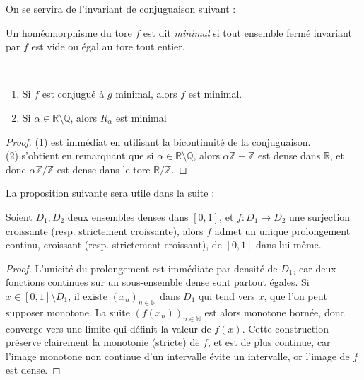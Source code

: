 \documentclass[11pt,a4paper]{article}
\begin{document}
On se servira de l'invariant de conjuguaison suivant : 

\begin{defin} 
Un homéomorphisme du tore $f$ est dit \textit{minimal} si tout ensemble fermé invariant par  $f$ est vide ou égal au tore tout entier. 
\end{defin}


\begin{prop}\label{minimal} ~
\begin{enumerate}
\item Si $f$ est conjugué à $g$ minimal, alors $f$ est minimal.
\item Si $\alpha \in \mathbb{R} \setminus \mathbb{Q}$, alors $R_\alpha$ est minimal
\end{enumerate}
\end{prop}

\begin{proof}
(1) est immédiat en utilisant la bicontinuité de la conjuguaison. \\
(2) s'obtient en remarquant que si $\alpha \in \mathbb{R} \setminus \mathbb{Q}$, alors $\alpha\mathbb{Z} + \mathbb{Z}$ est dense dans $\mathbb{R}$, et donc $\alpha\mathbb{Z}/\mathbb{Z}$ est dense dans le tore $\mathbb{R}/\mathbb{Z}$. 
\end{proof}

La proposition suivante sera utile dans la suite :


\begin{prop}\label{dense}
Soient $D_1,D_2$ deux ensembles denses dans $[0,1]$, et $f : D_1 \to D_2$ une surjection croissante (resp. strictement croissante), alors $f$ admet un unique prolongement continu, croissant (resp. strictement croissant), de $[0,1]$ dans lui-même.
\end{prop}

\begin{proof}
L'unicité du prolongement est immédiate par densité de $D_1$, car deux fonctions continues sur un sous-ensemble dense sont partout égales. Si $x\in [0,1]\setminus D_1$, il existe $(x_n)_{n\in \mathbb{N}}$ dans $D_1$ qui tend vers $x$, que l'on peut supposer monotone. La suite $(f(x_n))_{n\in\mathbb{N}}$ est alors monotone bornée, donc converge vers une limite qui définit la valeur de $f(x)$.
Cette construction préserve clairement la monotonie (stricte) de $f$, et est de plus continue, car l'image monotone non continue d'un intervalle évite un intervalle, or l'image de $f$ est dense. 
\end{proof} 
\end{document}
